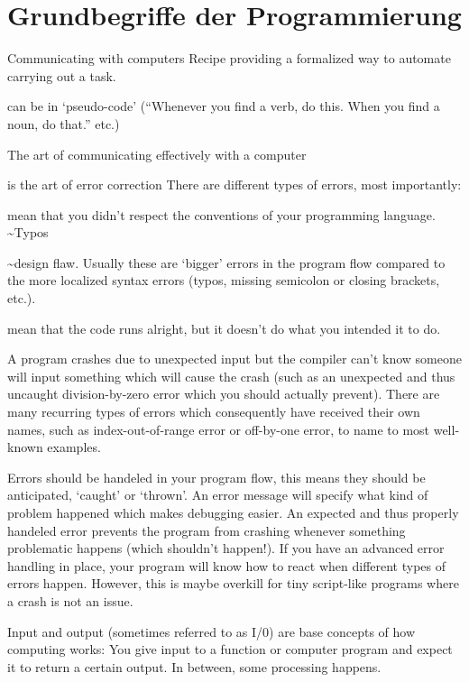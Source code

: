 \documentclass[10pt]{beamer}
\begin{document}
\section{Grundbegriffe der Programmierung}

\begin{frame}[allowframebreaks]{Communicating with computers}
\footnotesize
{} Recipe providing a formalized way to automate carrying out a task.

can be in `pseudo-code' (``Whenever you find a verb, do this. When you find a noun, do that.'' etc.)

 The art of communicating effectively with a computer

 is the art of error correction There are different types of errors, most importantly:

 mean that you didn't respect the conventions of your programming language. \textasciitilde Typos

 \textasciitilde design flaw. Usually these are `bigger' errors in the program flow compared to the more localized syntax errors (typos, missing semicolon or closing brackets, etc.).

 mean that the code runs alright, but it doesn't do what you intended it to do.

 A program crashes due to unexpected input but the compiler can't know someone will input something which will cause the crash (such as an unexpected and thus uncaught division-by-zero error which you should actually prevent). There are many recurring types of errors which consequently have received their own names, such as index-out-of-range error or off-by-one error, to name to most well-known examples.


 Errors should be handeled in your program flow, this means they should be anticipated, `caught' or `thrown'. An error message will specify what kind of problem happened which makes debugging easier. An expected and thus properly handeled error prevents the program from crashing whenever something problematic happens (which shouldn't happen!). If you have an advanced error handling in place, your program will know how to react when different types of errors happen. However, this is maybe overkill for tiny script-like programs where a crash is not an issue. 

 Input and output (sometimes referred to as I/0) are base concepts of how computing works: You give input to a function or computer program and expect it to return a certain output. In between, some processing happens.


\end{frame}
\end{document}
